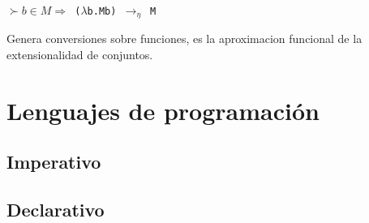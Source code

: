 \begin{defn}\end{defn}
\texttt{$\succ b \in M \Rightarrow$ ($\lambda$b.Mb) $\rightarrow_{\eta}$ M}
\begin{note}
Genera conversiones sobre funciones, es la aproximacion funcional de la extensionalidad de conjuntos.
\end{note}

\section{Lenguajes de programación}

\subsection{Imperativo}

\subsection{Declarativo}